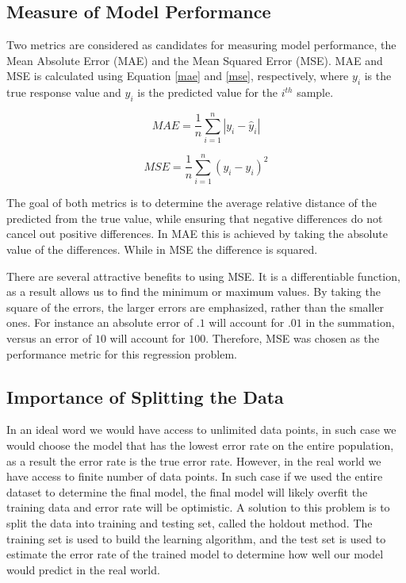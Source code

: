 \documentclass[12pt, letterpaper]{article}
\begin{document}
\subsection{Measure of Model Performance}

Two metrics are considered as candidates for measuring model performance, the Mean Absolute Error (MAE) and the Mean Squared Error (MSE). MAE and MSE is calculated using Equation \ref{mae} and \ref{mse}, respectively,  where $y_i$ is the true response value and $\hat y_i$ is the predicted value for the $i^{th}$ sample. 

 \begin{equation}
 \label{mae}
    MAE = \frac{1}{n}\sum_{i=1}^{n}|y_i-\hat y_i|
 \end{equation}
 
 \begin{equation}
 \label{mse}
    MSE = \frac{1}{n}\sum_{i=1}^{n}(y_i-\hat y_i)^2
 \end{equation}
 
The goal of both metrics is to determine the average relative distance of the predicted from the true value, while ensuring that negative differences do not cancel out positive differences. In MAE this is achieved by taking the absolute value of the differences. While in MSE the difference is squared. 

There are several attractive benefits to using MSE. It is a differentiable function, as a result allows us to find the minimum or maximum values. By taking the square of the errors, the larger errors are emphasized, rather than the smaller ones. For instance an absolute error of $.1$ will account for $.01$ in the summation, versus an error of $10$ will account for $100$. Therefore, MSE was chosen as the performance metric for this regression problem. 

\subsection{Importance of Splitting the Data}

In an ideal word we would have access to unlimited data points, in such case we would choose the model that has the lowest error rate on the entire population, as a result the error rate is the true error rate. However, in the real world we have access to finite number of data points. In such case if we used the entire dataset to determine the final model, the final model will likely overfit the training data and error rate will be optimistic. A solution to this problem is to split the data into training and testing set, called the holdout method. The training set is used to build the learning algorithm, and the test set is used to estimate the error rate of the trained model to determine how well our model would predict in the real world. 
\end{document}
